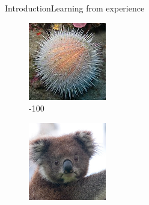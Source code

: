 \begin{frame}{Introduction}{Learning from experience}
\begin{figure}[ht]
\begin{minipage}[b]{0.20\linewidth}
\includegraphics[width=\textwidth]{img/introduction/urchin.png}
\\{\color{red}-100}
\end{minipage}
\hspace{0.1cm}
\begin{minipage}[b]{0.20\linewidth}
\centering
\includegraphics[width=\textwidth]{img/introduction/koala.png}

\end{minipage}
\end{figure}
\end{frame}
